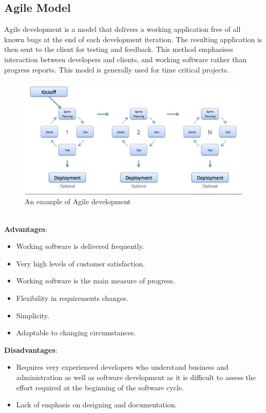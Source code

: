\documentclass[a4paper, 12pt]{report}
\begin{document}
\subsection{Agile Model}
Agile development is a model that delivers a working application free of all known bugs at the end of each development iteration. The resulting application is then sent to the client for testing and feedback. This method emphasises interaction between developers and clients, and working software rather than progress reports. This model is generally used for time critical projects\cite{agile}.
\begin{figure}[!htbp]
  \centering
    \includegraphics[width=1.0\textwidth]{agile-dev.jpg}
    \caption{An example of Agile development\cite{agile}}
    \label{fig:agile-dev}
\end{figure}\\
\textbf{Advantages}:
\begin{itemize}
\item Working software is delivered frequently.
\item Very high levels of customer satisfaction. 
\item Working software is the main measure of progress.
\item Flexibility in requirements changes.
\item Simplicity.
\item Adaptable to changing circumstances.
\end{itemize}
\textbf{Disadvantages}:
\begin{itemize}
\item Requires very experienced developers who understand business and administration as well as software development as it is difficult to assess the effort required at the beginning of the software cycle.
\item Lack of emphasis on designing and documentation.
\end{itemize}
\end{document}
